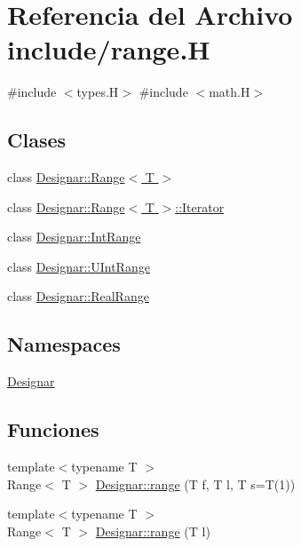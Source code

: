 \hypertarget{range_8_h}{}\section{Referencia del Archivo include/range.H}
\label{range_8_h}
{\ttfamily \#include $<$types.\+H$>$}\newline
{\ttfamily \#include $<$math.\+H$>$}\newline
\subsection*{Clases}
\begin{DoxyCompactItemize}
\item 
class \hyperlink{class_designar_1_1_range}{Designar\+::\+Range$<$ T $>$}
\item 
class \hyperlink{class_designar_1_1_range_1_1_iterator}{Designar\+::\+Range$<$ T $>$\+::\+Iterator}
\item 
class \hyperlink{class_designar_1_1_int_range}{Designar\+::\+Int\+Range}
\item 
class \hyperlink{class_designar_1_1_u_int_range}{Designar\+::\+U\+Int\+Range}
\item 
class \hyperlink{class_designar_1_1_real_range}{Designar\+::\+Real\+Range}
\end{DoxyCompactItemize}
\subsection*{Namespaces}
\begin{DoxyCompactItemize}
\item 
 \hyperlink{namespace_designar}{Designar}
\end{DoxyCompactItemize}
\subsection*{Funciones}
\begin{DoxyCompactItemize}
\item 
{\footnotesize template$<$typename T $>$ }\\Range$<$ T $>$ \hyperlink{namespace_designar_aae435a76c71e126af37716ef5549d79d}{Designar\+::range} (T f, T l, T s=T(1))
\item 
{\footnotesize template$<$typename T $>$ }\\Range$<$ T $>$ \hyperlink{namespace_designar_a98dd2d05fccceaa32cdbf3f34c7dc120}{Designar\+::range} (T l)
\end{DoxyCompactItemize}
